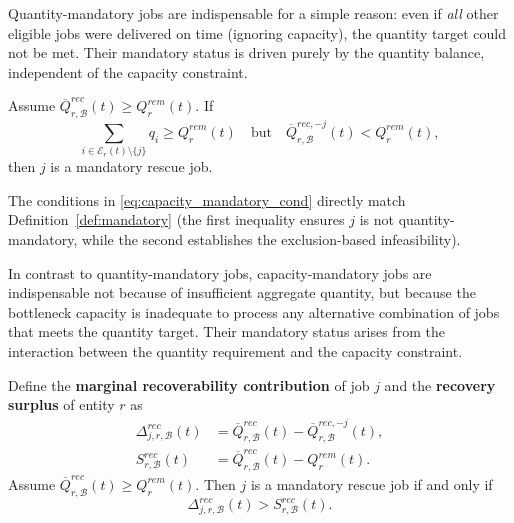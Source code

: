 Quantity-mandatory jobs are indispensable for a simple reason: even if \emph{all} other eligible jobs were delivered on time (ignoring capacity), the quantity target could not be met. Their mandatory status is driven purely by the quantity balance, independent of the capacity constraint.

\begin{proposition}\label{prop:capacity_mandatory}
Assume $\overline Q_{r,\mathcal B}^{rec}(t)\ge Q_r^{rem}(t)$. If
\begin{equation}\label{eq:capacity_mandatory_cond}
\sum_{i\in\mathcal E_r(t)\setminus\{j\}}q_i\ge Q_r^{rem}(t)
\quad\text{but}\quad
\overline Q_{r,\mathcal B}^{rec,-j}(t)<Q_r^{rem}(t),
\end{equation}
then $j$ is a mandatory rescue job.
\end{proposition}

\begin{pf}
The conditions in \eqref{eq:capacity_mandatory_cond} directly match Definition~\ref{def:mandatory} (the first inequality ensures $j$ is not quantity-mandatory, while the second establishes the exclusion-based infeasibility).
\end{pf}

In contrast to quantity-mandatory jobs, capacity-mandatory jobs are indispensable not because of insufficient aggregate quantity, but because the bottleneck capacity is inadequate to process any alternative combination of jobs that meets the quantity target. Their mandatory status arises from the interaction between the quantity requirement and the capacity constraint.

\begin{proposition}\label{prop:marginal}
Define the \textbf{marginal recoverability contribution} of job $j$ and the \textbf{recovery surplus} of entity $r$ as
\begin{align}
\Delta_{j,r,\mathcal B}^{rec}(t)&=\overline Q_{r,\mathcal B}^{rec}(t)-\overline Q_{r,\mathcal B}^{rec,-j}(t),\label{eq:marginal_def}\\
S_{r,\mathcal B}^{rec}(t)&=\overline Q_{r,\mathcal B}^{rec}(t)-Q_r^{rem}(t).\label{eq:surplus_def}
\end{align}
Assume $\overline Q_{r,\mathcal B}^{rec}(t)\ge Q_r^{rem}(t)$. Then $j$ is a mandatory rescue job if and only if
\begin{equation}\label{eq:marginal_condition}
\Delta_{j,r,\mathcal B}^{rec}(t)>S_{r,\mathcal B}^{rec}(t).
\end{equation}
\end{proposition}

